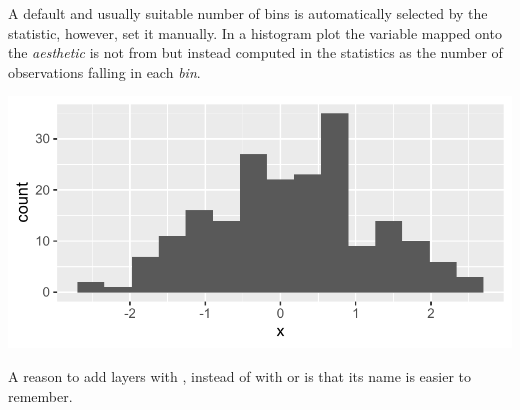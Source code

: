 \documentclass[krantz2]{krantz}\usepackage{knitr}
\begin{document}
A default and usually suitable number of bins is automatically selected by the  statistic, however,  set it manually. In a histogram plot the variable mapped onto the  \emph{aesthetic} is not from  but instead computed in the statistics as the number of observations falling in each \emph{bin}.

\begin{knitrout}\footnotesize
{}\color{fgcolor}\begin{kframe}
\begin{alltt}
\hlstd{(}   \hlstd{=} \hlstd{(}  \hlopt{+}
  \hlstd{(} \hlstd{=} \hlstd{)}
\end{alltt}
\end{kframe}

{\centering \includegraphics[width=.7\textwidth]{figure/pos-histogram-plot-01-1} 

}


\end{knitrout}

\begin{explainbox}
A reason to add layers with , instead of with  or  is that its name is easier to remember.

\begin{knitrout}\footnotesize
{}\color{fgcolor}\begin{kframe}
\begin{alltt}
\hlstd{(} 
        \hlstd{=} \hlstd{(}    \hlopt{+}
  \hlstd{(} \hlstd{=} \hlstd{,}  \hlstd{=} \hlstd{)}
\end{alltt}
\end{kframe}
\end{knitrout}
\end{explainbox}
\end{document}
